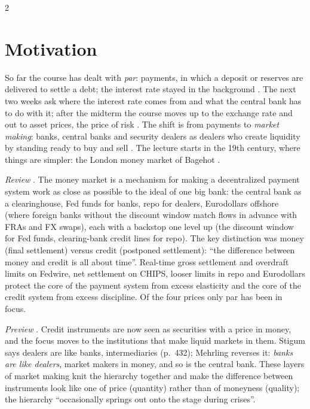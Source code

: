\begin{paracol}{2}
\section*{Motivation}
So far the course has dealt with \emph{par}: payments, in which a deposit or reserves are delivered to settle a debt; the interest rate stayed in the
background . The next two weeks ask where the interest rate comes from and what the central bank has to do with it; after the
midterm the course moves up to the exchange rate and out to asset prices, the price of risk . The shift is from payments to
\emph{market making}: banks, central banks and security dealers as dealers who create liquidity by standing ready to buy and sell .
The lecture starts in the 19th century, where things are simpler: the London money market of Bagehot .

\begin{intuition}
\emph{Review} . The money market is a mechanism for making a decentralized payment system work as close as possible to the ideal of one big bank: the central bank as a
clearinghouse, Fed funds for banks, repo for dealers, Eurodollars offshore (where foreign banks without the discount window match flows in advance with FRAs and FX swaps), each with a
backstop one level up (the discount window for Fed funds, clearing-bank credit lines for repo). The key distinction was money (final settlement) versus credit (postponed settlement):
``the difference between money and credit is all about time''. Real-time gross settlement and overdraft limits on Fedwire, net settlement on CHIPS, looser limits in repo and Eurodollars
protect the core of the payment system from excess elasticity and the core of the credit system from excess discipline. Of the four prices only par has been in focus.

\emph{Preview} . Credit instruments are now seen as securities with a price in money, and the focus moves to the institutions that make liquid markets in them. Stigum says
dealers are like banks, intermediaries (p.~432); Mehrling reverses it: \emph{banks are like dealers}, market makers in money, and so is the central bank. These layers of market making knit
the hierarchy together and make the difference between instruments look like one of price (quantity) rather than of moneyness (quality); the hierarchy ``occasionally springs out onto the
stage during crises''.
\end{intuition}


\end{paracol}
